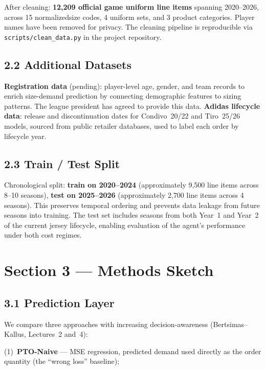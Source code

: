 \documentclass[11pt]{article}
\begin{document}
\vspace{4pt}
After cleaning: \textbf{12{,}209 official game uniform line items} spanning 2020--2026, across 15 normalizedsize codes,
4 uniform sets, and 3 product categories. Player names have been removed for privacy. The cleaning pipeline is reproducible via
\texttt{scripts/clean\_data.py} in the project repository.

\subsection*{2.2 \; Additional Datasets}

\textbf{Registration data} (pending): player-level age, gender, and team records to enrich size-demand
prediction by connecting demographic features to sizing patterns. The league president has agreed to provide this data. 
\textbf{Adidas lifecycle data}: release and discontinuation dates for Condivo~20/22 and
Tiro~25/26 models, sourced from public retailer databases, used to label each order by lifecycle year.

\subsection*{2.3 \; Train / Test Split}

Chronological split: \textbf{train on 2020--2024} (approximately 9{,}500 line items across 8--10
seasons), \textbf{test on 2025--2026} (approximately 2{,}700 line items across 4 seasons). This
preserves temporal ordering and prevents data leakage from future seasons into training. The test set
includes seasons from both Year~1 and Year~2 of the current jersey lifecycle, enabling evaluation of
the agent's performance under both cost regimes.

\section{Section 3 — Methods Sketch}

\subsection*{3.1 \; Prediction Layer}

We compare three approaches with increasing decision-awareness (Bertsimas--Kallus, Lectures~2 and~4):

(1)~\textbf{PTO-Naive} --- MSE regression, predicted demand used directly as the order quantity (the
``wrong loss'' baseline);
\end{document}
